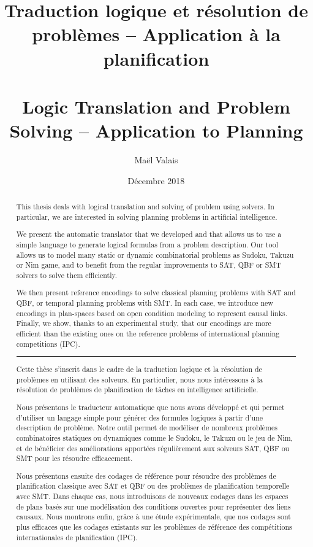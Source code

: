 \documentclass[a4paper,12pt,twoside]{extbook}
\title{Traduction logique et résolution de problèmes -- Application à la planification\\~\\Logic Translation and Problem Solving -- Application to Planning}
\author{Maël Valais}
\date{Décembre 2018}
\begin{document}


\begin{abstract}
This thesis deals with logical translation and solving of problem using solvers.
In particular, we are interested in solving planning problems in artificial intelligence.

We present the automatic translator \touist that we developed and that allows us to use a simple language to generate logical formulas from a problem description. Our tool allows us to model many static or dynamic combinatorial problems as Sudoku, Takuzu or Nim game, and to benefit from the regular improvements to SAT, QBF or SMT solvers to solve them efficiently.

We then present reference encodings to solve classical planning problems with SAT and QBF, or temporal planning problems with SMT. In each case, we introduce new encodings in plan-spaces based on open condition modeling to represent causal links.
Finally, we show, thanks to an experimental study, that our encodings are more efficient than the existing ones on the reference problems of international planning competitions (IPC).

\rule{\linewidth}{.5pt}

Cette thèse s'inscrit dans le cadre de la traduction logique et la résolution de problèmes en utilisant des solveurs. En particulier, nous nous intéressons à la résolution de problèmes de planification de tâches en intelligence artificielle.

Nous présentons le traducteur automatique \touist que nous avons développé et qui permet d'utiliser un langage simple pour générer des formules logiques à partir d'une description de problème. Notre outil permet de modéliser de nombreux problèmes combinatoires statiques ou dynamiques comme le Sudoku, le Takuzu ou le jeu de Nim, et de bénéficier des améliorations apportées régulièrement aux solveurs SAT, QBF ou SMT pour les résoudre efficacement.

Nous présentons ensuite des codages de référence pour résoudre des problèmes de planification classique avec SAT et QBF ou des problèmes de planification temporelle avec SMT. Dans chaque cas, nous introduisons de nouveaux codages dans les espaces de plans basés sur une modélisation des conditions ouvertes pour représenter des liens causaux.
Nous montrons enfin, grâce à une étude expérimentale, que nos codages sont plus efficaces que les codages existants sur les problèmes de référence des compétitions internationales de planification (IPC).
\end{abstract}
\end{document}

